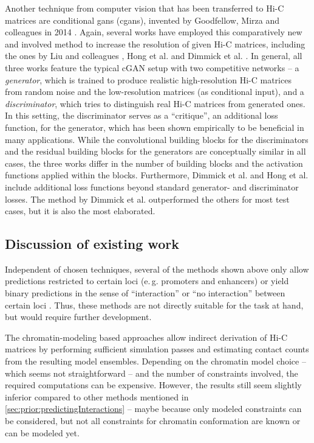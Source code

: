 Another technique from computer vision that has been transferred to Hi-C matrices are conditional \acrlong{gan}s (c\acrshort{gan}s), 
invented by Goodfellow, Mirza and colleagues in 2014 \cite{Goodfellow2014, mirza2014}. 
Again, several works have employed this comparatively new and involved method to increase the resolution of given Hi-C matrices, 
including the ones by Liu and colleagues \cite{Liu2019}, Hong et al. \cite{Hong2020} and Dimmick et al. \cite{Dimmick2020}.
In general, all three works feature the typical cGAN setup with two competitive networks -- a \emph{generator}, 
which is trained to produce realistic high-resolution Hi-C matrices from random noise and the low-resolution matrices (as conditional input), 
and a \emph{discriminator}, which tries to distinguish real Hi-C matrices from generated ones.
In this setting, the discriminator serves as a ``critique'', an additional loss function, for the generator,
which has been shown empirically to be beneficial in many applications.
While the convolutional building blocks for the discriminators and the residual building blocks for the generators are conceptually similar
in all cases, the three works differ in the number of building blocks and the activation functions applied within the blocks.
Furthermore, Dimmick et al. and Hong et al. include additional loss functions beyond standard generator- and discriminator losses. 
The method by Dimmick et al. outperformed the others for most test cases, but it is also the most elaborated.

\subsection{Discussion of existing work} \label{sec:prior:discussion}
Independent of chosen techniques, several of the methods shown above only allow predictions restricted to certain loci (e.\,g. promoters and enhancers)
or yield binary predictions in the sense of ``interaction'' or ``no interaction'' between certain loci \cite{Bkhetan2018, Kai2018,Martens2020,Singh2019}.
Thus, these methods are not directly suitable for the task at hand, but would require further development.

The chromatin-modeling based approaches \cite{Brackley2016, MacPherson2018, Pierro2017, Qi2019} allow indirect derivation of Hi-C matrices
by performing sufficient simulation passes and estimating contact counts from the resulting model ensembles.
Depending on the chromatin model choice -- which seems not straightforward \cite{Huang2018, Bendandi2020} -- and the number of constraints involved,
the required computations can be expensive.
However, the results still seem slightly inferior compared to other methods mentioned in \cref{sec:prior:predictingInteractions} --
maybe because only modeled constraints can be considered, but not all constraints for chromatin conformation are known or can be modeled yet.

